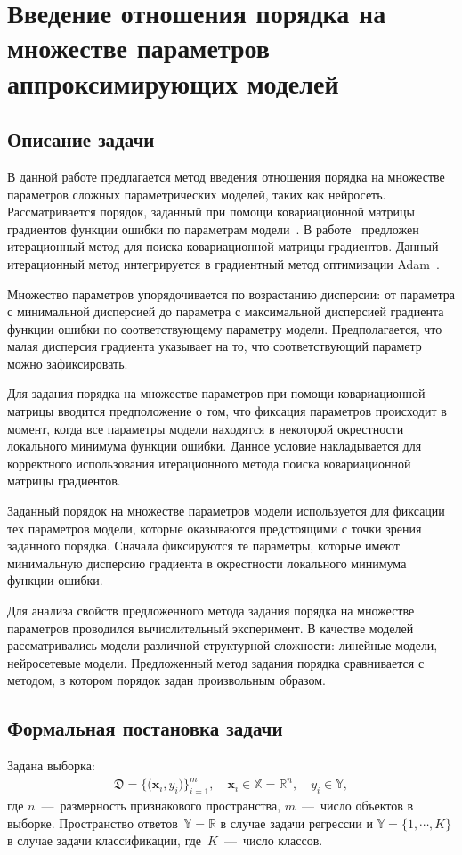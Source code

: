 \newpage

\section{Введение отношения порядка на множестве параметров аппроксимирующих моделей}
\subsection{Описание задачи}
В данной работе предлагается метод введения отношения порядка на множестве параметров сложных параметрических моделей, таких как нейросеть. Рассматривается порядок, заданный при помощи ковариационной матрицы градиентов функции ошибки по параметрам модели~\cite{Mandt2017}. В работе~\cite{Chunyan2016} предложен итерационный метод для поиска ковариационной матрицы градиентов. Данный итерационный метод интегрируется в градиентный метод оптимизации Adam~\cite{Kingma2014}.

Множество параметров упорядочивается по возрастанию дисперсии: от параметра с минимальной дисперсией до параметра с максимальной дисперсией градиента функции ошибки по соответствующему параметру модели. Предполагается, что малая дисперсия градиента указывает на то, что соответствующий параметр можно зафиксировать.

Для задания порядка на множестве параметров при помощи ковариационной матрицы вводится предположение о том, что фиксация параметров происходит в момент, когда все параметры модели находятся в некоторой окрестности локального минимума функции ошибки. Данное условие накладывается для корректного использования итерационного метода поиска ковариационной матрицы градиентов.

Заданный порядок на множестве параметров модели используется для фиксации тех параметров модели, которые оказываются предстоящими с точки зрения заданного порядка. Сначала фиксируются те параметры, которые имеют минимальную дисперсию градиента в окрестности локального минимума функции ошибки.

Для анализа свойств предложенного метода задания порядка на множестве параметров проводился вычислительный эксперимент. В качестве моделей рассматривались модели различной структурной сложности: линейные модели, нейросетевые модели. Предложенный метод задания порядка сравнивается с методом, в котором порядок задан произвольным образом.
\subsection{Формальная постановка задачи}
Задана выборка:
\begin{equation}
\label{eq:st:1}
\begin{aligned}
\mathfrak{D} = \bigr\{\bigr(\textbf{x}_i, y_i\bigr)\bigr\}_{i=1}^{m}, \quad \textbf{x}_{i} \in \mathbb{X} = \mathbb{R}^{n}, \quad y_i \in \mathbb{Y},
\end{aligned}
\end{equation}
где $n$~---~размерность признакового пространства, $m$~---~число объектов в выборке. Пространство ответов~$\mathbb{Y} = \mathbb{R}$ в случае задачи регрессии и  $\mathbb{Y} = \{1,\cdots, K\}$ в случае задачи классификации, где~$K$~---~число классов.

